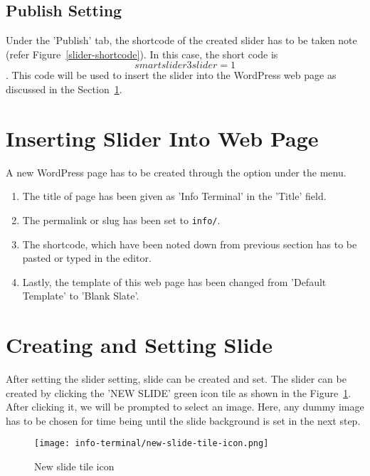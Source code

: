 \subsection*{Publish Setting}
Under the 'Publish' tab, the shortcode of the created slider has to be taken note (refer Figure~\ref{slider-shortcode}). In this case, the short code is \texttt{\[smartslider3 slider=1\]}. This code will be used to insert the slider into the WordPress web page as discussed in the Section~\ref{inserting-slider-into-web-page}.

\section{Inserting Slider Into Web Page} \label{inserting-slider-into-web-page}
A new WordPress page has to be created through the   option under the  menu.
\begin{enumerate}
\item The title of page has been given as 'Info Terminal' in the 'Title' field.
\item The permalink or slug has been set to \texttt{info/}.
\item The shortcode, which have been noted down from previous section has to be pasted or typed in the editor.
\item Lastly, the template of this web page has been changed from 'Default Template' to 'Blank Slate'.
\end{enumerate}

\section{Creating and Setting Slide}
After setting the slider setting, slide can be created and set. The slider can be created by clicking the 'NEW SLIDE' green icon tile as shown in the Figure~\ref{new-slide-tile-icon}. After clicking it, we will be prompted to select an image. Here, any dummy image has to be chosen for time being until the slide background is set in the next step.
\begin{figure}[ht]
\caption{New slide tile icon}
\label{new-slide-tile-icon}
\centering
\texttt{[image: info-terminal/new-slide-tile-icon.png]}
\end{figure}

